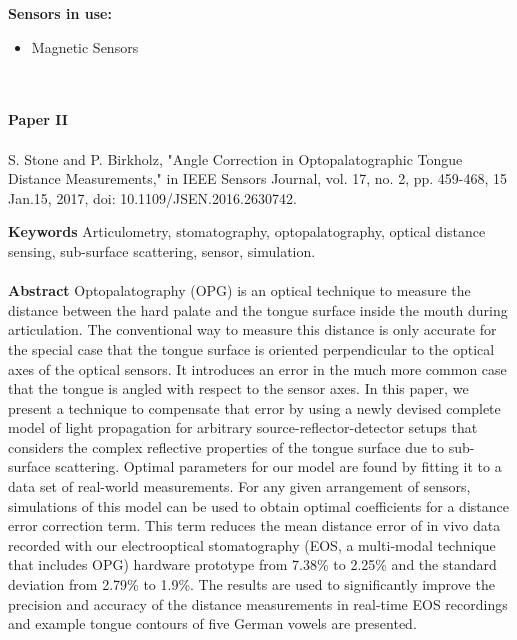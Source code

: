 \noindent
\textbf{Sensors in use:}
\begin{itemize}
    \item Magnetic Sensors \\ \\
\end{itemize}

\\ 
\textbf{Paper II} 
\\ \\
\noindent
S. Stone and P. Birkholz, "Angle Correction in Optopalatographic Tongue Distance Measurements," in IEEE Sensors Journal, vol. 17, no. 2, pp. 459-468, 15 Jan.15, 2017, doi: 10.1109/JSEN.2016.2630742.

\noindent
\textbf{Keywords} Articulometry, stomatography, optopalatography, optical distance sensing, sub-surface scattering, sensor, simulation.
\\ \\

\noindent
\textbf{Abstract} Optopalatography (OPG) is an optical technique to measure the distance between the hard palate and the tongue surface inside the mouth during articulation. The conventional way to measure this distance is only accurate for the special case that the tongue surface is oriented perpendicular to the optical axes of the optical sensors. It introduces an error in the much more common case that the tongue is angled with respect to the sensor axes. In this paper, we present a technique to compensate that error by using a newly devised complete model of light propagation for arbitrary source-reflector-detector setups that considers the complex reflective properties of the tongue surface due to sub-surface scattering. Optimal parameters for our model are found by fitting it to a data set of real-world measurements. For any given arrangement of sensors, simulations of this model can be used to obtain optimal coefficients for a distance error correction term. This term reduces the mean distance error of in vivo data recorded with our electrooptical stomatography (EOS, a multi-modal technique that includes OPG) hardware prototype from 7.38\% to 2.25\% and the standard deviation from 2.79\% to 1.9\%. The results are used to significantly improve the precision and accuracy of the distance measurements in real-time EOS recordings and example tongue contours of five German vowels are presented.


\\ \\

